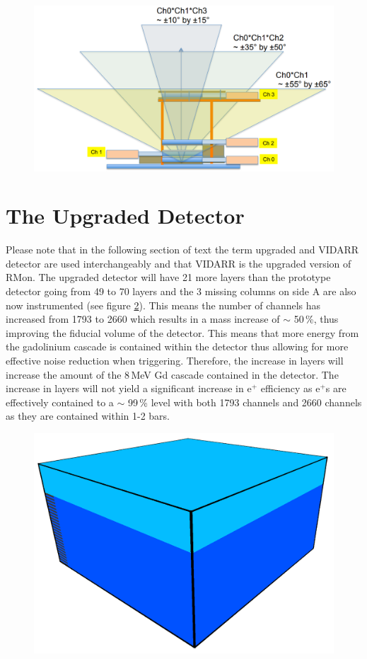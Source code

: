 \begin{figure}[!h]
 \centering
 \includegraphics[width=0.7\linewidth]{Chapter2/Figs/Raster/Prospect_MuonPaddels.png}
 \label{fig:Prospect_MuonPaddels}
\end{figure}

\section{The Upgraded Detector}\label{sec:theUpgradedDetector}
Please note that in the following section of text the term upgraded and VIDARR detector are used interchangeably and that VIDARR is the upgraded version of RMon. The upgraded detector will have 21 more layers than the prototype detector going from 49 to 70 layers and the 3 missing columns on side A are also now instrumented (see figure \ref{fig:detectorUpgradedmassOutlined}). This means the number of channels has increased from 1793 to 2660 which results in a mass increase of $\sim$ 50\,\%, thus improving the fiducial volume of the detector. This means that more energy from the gadolinium cascade is contained within the detector thus allowing for more effective noise reduction when triggering. Therefore, the increase in layers will increase the amount of the 8\,MeV Gd cascade contained in the detector. The increase in layers will not yield a significant increase in e$^+$ efficiency as e$^+$s are effectively contained to a $\sim$ 99\,\% level with both 1793 channels and 2660 channels as they are contained within 1-2 bars.

\begin{figure}[!h]
 \centering
 \includegraphics[width=0.5\linewidth]{Chapter3/Figs/detectorUpgradedmassOutlined.png}
 \label{fig:detectorUpgradedmassOutlined}
\end{figure}

